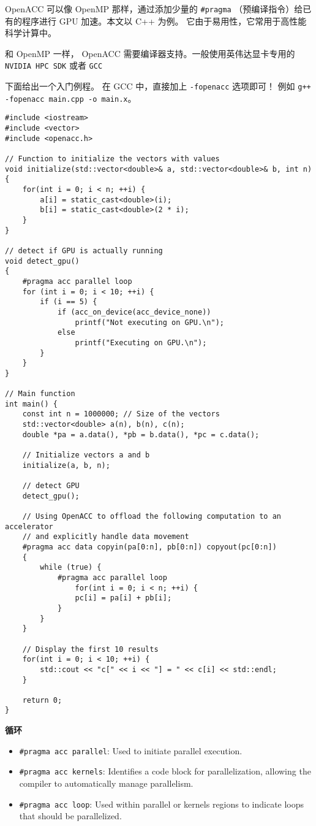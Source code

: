 
\begin{issues}
\issueDraft
\end{issues}


OpenACC 可以像 OpenMP 那样，通过添加少量的 \verb`#pragma` （预编译指令）给已有的程序进行 GPU 加速。本文以 C++ 为例。 它由于易用性，它常用于高性能科学计算中。

和 OpenMP 一样， OpenACC 需要编译器支持。一般使用英伟达显卡专用的 \verb`NVIDIA HPC SDK` 或者 \verb`GCC`

下面给出一个入门例程。 在 GCC 中，直接加上 \verb`-fopenacc` 选项即可！ 例如 \verb`g++ -fopenacc main.cpp -o main.x`。

\begin{lstlisting}[language=none,caption=test1.cpp]
#include <iostream>
#include <vector>
#include <openacc.h>

// Function to initialize the vectors with values
void initialize(std::vector<double>& a, std::vector<double>& b, int n) {
	for(int i = 0; i < n; ++i) {
		a[i] = static_cast<double>(i);
		b[i] = static_cast<double>(2 * i);
	}
}

// detect if GPU is actually running
void detect_gpu()
{
	#pragma acc parallel loop
	for (int i = 0; i < 10; ++i) {
		if (i == 5) {
			if (acc_on_device(acc_device_none))
				printf("Not executing on GPU.\n");
			else
				printf("Executing on GPU.\n");
		}
	}
}

// Main function
int main() {
	const int n = 1000000; // Size of the vectors
	std::vector<double> a(n), b(n), c(n);
	double *pa = a.data(), *pb = b.data(), *pc = c.data();

	// Initialize vectors a and b
	initialize(a, b, n);

	// detect GPU
	detect_gpu();

	// Using OpenACC to offload the following computation to an accelerator
	// and explicitly handle data movement
	#pragma acc data copyin(pa[0:n], pb[0:n]) copyout(pc[0:n])
	{
		while (true) {
			#pragma acc parallel loop
				for(int i = 0; i < n; ++i) {
				pc[i] = pa[i] + pb[i];
			}
		}
	}

	// Display the first 10 results
	for(int i = 0; i < 10; ++i) {
		std::cout << "c[" << i << "] = " << c[i] << std::endl;
	}

	return 0;
}
\end{lstlisting}

\textbf{循环}
\begin{itemize}
\item \verb`#pragma acc parallel`: Used to initiate parallel execution.
\item \verb`#pragma acc kernels`: Identifies a code block for parallelization, allowing the compiler to automatically manage parallelism.
\item \verb`#pragma acc loop`: Used within parallel or kernels regions to indicate loops that should be parallelized.
\end{itemize}

